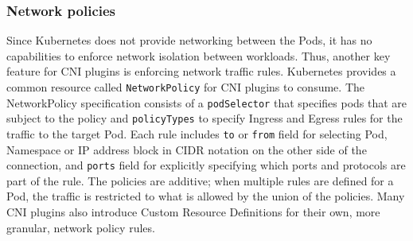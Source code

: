 \documentclass[english,12pt,a4paper,pdftex,sci,utf8]{aaltothesis}
\begin{document}


\subsubsection{Network policies}

Since Kubernetes does not provide networking between the Pods, it has no capabilities to enforce network isolation between workloads. Thus, another key feature for CNI plugins is enforcing network traffic rules. Kubernetes provides a common resource called \texttt{NetworkPolicy} for CNI plugins to consume. The NetworkPolicy specification consists of a \texttt{podSelector} that specifies pods that are subject to the policy and \texttt{policyTypes} to specify Ingress and Egress rules for the traffic \cite{budigiri2021network} to the target Pod. Each rule includes \texttt{to} or \texttt{from} field for selecting Pod, Namespace or IP address block in CIDR notation on the other side of the connection, and \texttt{ports} field for explicitly specifying which ports and protocols are part of the rule. The policies are additive; when multiple rules are defined for a Pod, the traffic is restricted to what is allowed by the union of the policies. Many CNI plugins also introduce Custom Resource Definitions for their own, more granular, network policy rules.
\end{document}

